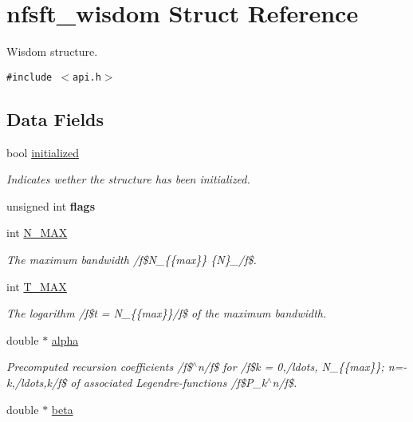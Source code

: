 \hypertarget{structnfsft__wisdom}{
\section{nfsft\_\-wisdom Struct Reference}
\label{structnfsft__wisdom}
}
Wisdom structure.  


{\tt \#include $<$api.h$>$}

\subsection*{Data Fields}
\begin{CompactItemize}
\item 
\hypertarget{structnfsft__wisdom_o0}{
bool \hyperlink{structnfsft__wisdom_o0}{initialized}}
\label{structnfsft__wisdom_o0}

\begin{CompactList}\small\item\em Indicates wether the structure has been initialized. \item\end{CompactList}\item 
\hypertarget{structnfsft__wisdom_o1}{
unsigned int {\bf flags}}
\label{structnfsft__wisdom_o1}

\item 
\hypertarget{structnfsft__wisdom_o2}{
int \hyperlink{structnfsft__wisdom_o2}{N\_\-MAX}}
\label{structnfsft__wisdom_o2}

\begin{CompactList}\small\item\em The maximum bandwidth /f\$N\_\-\{\{max\}\}  \{N\}\_/f\$. \item\end{CompactList}\item 
\hypertarget{structnfsft__wisdom_o3}{
int \hyperlink{structnfsft__wisdom_o3}{T\_\-MAX}}
\label{structnfsft__wisdom_o3}

\begin{CompactList}\small\item\em The logarithm /f\$t =  N\_\-\{\{max\}\}/f\$ of the maximum bandwidth. \item\end{CompactList}\item 
\hypertarget{structnfsft__wisdom_o4}{
double $\ast$ \hyperlink{structnfsft__wisdom_o4}{alpha}}
\label{structnfsft__wisdom_o4}

\begin{CompactList}\small\item\em Precomputed recursion coefficients /f\$$^\wedge$n/f\$ for /f\$k = 0,/ldots, N\_\-\{\{max\}\}; n=-k,/ldots,k/f\$ of associated Legendre-functions /f\$P\_\-k$^\wedge$n/f\$. \item\end{CompactList}\item 
\hypertarget{structnfsft__wisdom_o5}{
double $\ast$ \hyperlink{structnfsft__wisdom_o5}{beta}}
\label{structnfsft__wisdom_o5}


\end{CompactItemize}
